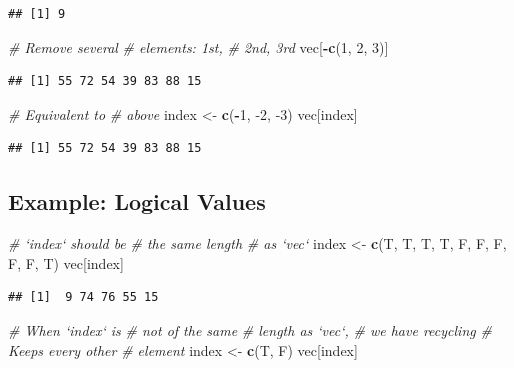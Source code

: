 \documentclass[
]{book}
\newenvironment{Shaded}{\begin{snugshade}}{\end{snugshade}}
\newcommand{\CommentTok}[1]{\textcolor[rgb]{0.56,0.35,0.01}{\textit{#1}}}
\newcommand{\DecValTok}[1]{\textcolor[rgb]{0.00,0.00,0.81}{#1}}
\newcommand{\KeywordTok}[1]{\textcolor[rgb]{0.13,0.29,0.53}{\textbf{#1}}}
\newcommand{\NormalTok}[1]{#1}
\newcommand{\OperatorTok}[1]{\textcolor[rgb]{0.81,0.36,0.00}{\textbf{#1}}}
\newcommand{\StringTok}[1]{\textcolor[rgb]{0.31,0.60,0.02}{#1}}
\begin{document}
\begin{verbatim}
## [1] 9
\end{verbatim}

\begin{Shaded}
\begin{Highlighting}[]
\CommentTok{# Remove several}
\CommentTok{# elements: 1st,}
\CommentTok{# 2nd, 3rd}
\NormalTok{vec[}\OperatorTok{-}\KeywordTok{c}\NormalTok{(}\DecValTok{1}\NormalTok{, }\DecValTok{2}\NormalTok{, }\DecValTok{3}\NormalTok{)]}
\end{Highlighting}
\end{Shaded}

\begin{verbatim}
## [1] 55 72 54 39 83 88 15
\end{verbatim}

\begin{Shaded}
\begin{Highlighting}[]
\CommentTok{# Equivalent to}
\CommentTok{# above}
\NormalTok{index <-}\StringTok{ }\KeywordTok{c}\NormalTok{(}\OperatorTok{-}\DecValTok{1}\NormalTok{, }\DecValTok{-2}\NormalTok{, }\DecValTok{-3}\NormalTok{)}
\NormalTok{vec[index]}
\end{Highlighting}
\end{Shaded}

\begin{verbatim}
## [1] 55 72 54 39 83 88 15
\end{verbatim}

\hypertarget{example-logical-values}{%
\subsection*{Example: Logical Values}\label{example-logical-values}}

\begin{Shaded}
\begin{Highlighting}[]
\CommentTok{# `index` should be}
\CommentTok{# the same length}
\CommentTok{# as `vec`}
\NormalTok{index <-}\StringTok{ }\KeywordTok{c}\NormalTok{(T, T, T, T,}
\NormalTok{    F, F, F, F, F, T)}
\NormalTok{vec[index]}
\end{Highlighting}
\end{Shaded}

\begin{verbatim}
## [1]  9 74 76 55 15
\end{verbatim}

\begin{Shaded}
\begin{Highlighting}[]
\CommentTok{# When `index` is}
\CommentTok{# not of the same}
\CommentTok{# length as `vec`,}
\CommentTok{# we have recycling}
\CommentTok{# Keeps every other}
\CommentTok{# element}
\NormalTok{index <-}\StringTok{ }\KeywordTok{c}\NormalTok{(T, F)}
\NormalTok{vec[index]}
\end{Highlighting}
\end{Shaded}
\end{document}
